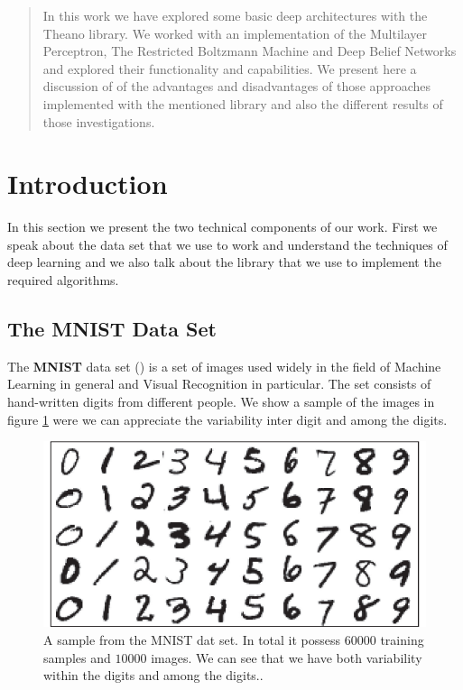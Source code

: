 \documentclass[11pt,a4paper]{article}
\begin{document}
\begin{abstract}
In this work we have explored some basic deep architectures with the Theano library. We worked with an implementation of the Multilayer Perceptron, The Restricted Boltzmann Machine and Deep Belief Networks and explored their functionality and capabilities. We present here a discussion of of the advantages and disadvantages of those approaches implemented with the mentioned library and also the different results of those investigations.
\end{abstract}

\section{Introduction}

In this section we present the two technical components of our work. First we speak about the data set that we use to work and understand the techniques of deep learning and we also talk about the library that we use to implement the required algorithms. 

\subsection{The MNIST Data Set}
The \textbf{MNIST}  data set (\cite{lecun1998mnist}) is a set of images used widely in the field of Machine Learning in general and Visual Recognition in particular. The set consists of hand-written digits from different people. We show a sample of the images in figure \ref{fig:mnist_example} were we can appreciate the variability inter digit and among the digits. 

\begin{center}
\begin{figure}[H]
\centering
\includegraphics[scale=.45]{mnist_example.png} 
\caption{A sample from the MNIST dat set. In total it possess $60000$ training samples and $10000$ images.  We can see that we have both variability within the digits and among the digits..}
\label{fig:mnist_example}
\end{figure} 
\end{center}
\end{document}
